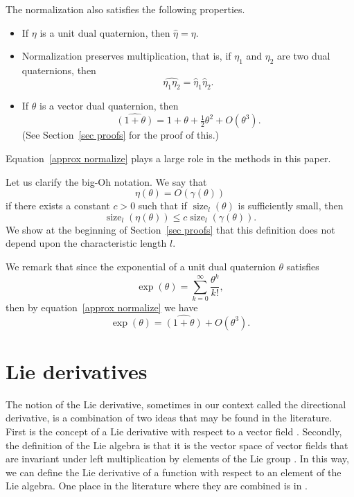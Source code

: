 \documentclass[reqno,12pt]{amsart}
\DeclareMathOperator\size{{size}}
\begin{document}
The normalization also satisfies the following properties.
\begin{itemize}
\item If $\eta$ is a unit dual quaternion, then $\widehat\eta = \eta$.
\item Normalization preserves multiplication, that is, if $\eta_1$ and $\eta_2$ are two dual quaternions, then
\begin{equation}
\widehat{\eta_1 \eta_2} = \widehat \eta_1 \widehat \eta_2 .
\end{equation}
\item If $\theta$ is a vector dual quaternion, then
\begin{equation}
\label{approx normalize}
\widehat {(1+\theta)} = 1 + \theta + \tfrac12 \theta^2 + O(\theta^3).
\end{equation}
(See Section~\ref{sec proofs} for the proof of this.)
\end{itemize}
Equation~\eqref{approx normalize} plays a large role in the methods in this paper.

Let us clarify the big-Oh notation.  We say that
\begin{equation}
\eta(\theta) = O(\gamma(\theta))
\end{equation}
if there exists a constant $c>0$ such that if $\size_l(\theta)$ is sufficiently small, then
\begin{equation}
\size_l( \eta(\theta)) \le c \size_l ( \gamma(\theta)) .
\end{equation}
We show at the beginning of Section~\ref{sec proofs} that this definition does not depend upon the characteristic length $l$.

We remark that since the exponential of a unit dual quaternion $\theta$ \cite{wang-et-al} satisfies
\begin{equation}
\label{exponential}
\exp(\theta) = \sum_{k=0}^\infty \frac{\theta^k}{k!},
\end{equation}
then by equation~\eqref{approx normalize} we have
\begin{equation}
\label{exp-normal}
\exp(\theta) = \widehat{(1+\theta)} + O(\theta^3) .
\end{equation}

\section{Lie derivatives}
\label{sec lie derivatives}

The notion of the Lie derivative, sometimes in our context called the directional derivative, is a combination of two ideas that may be found in the literature.  First is the concept of a Lie derivative with respect to a vector field \cite{yano}.  Secondly, the definition of the Lie algebra is that it is the vector space of vector fields that are invariant under left multiplication by elements of the Lie group \cite{lee}.  In this way, we can define the Lie derivative of a function with respect to an element of the Lie algebra.  One place in the literature where they are combined is in \cite[equation~(5), Chapter~II]{helgason}.
\end{document}
